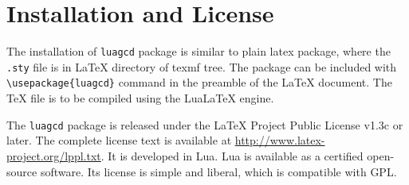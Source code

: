 \documentclass{article}
\begin{document}
\section{Installation and License}

The installation of \verb|luagcd| package is similar to plain latex package, where the \texttt{.sty} file is in LaTeX directory of texmf tree. The package can be included with \verb|\usepackage{luagcd}| command in the preamble of the LaTeX document. The TeX file is to be compiled using the LuaLaTeX engine.

The \verb|luagcd| package is released under the LaTeX Project Public License v1.3c or later. The complete license text is available at \url{http://www.latex-project.org/lppl.txt}. It is developed in Lua.  Lua is available as a certified open-source software. Its license is simple and liberal, which is compatible with GPL.
\end{document}
